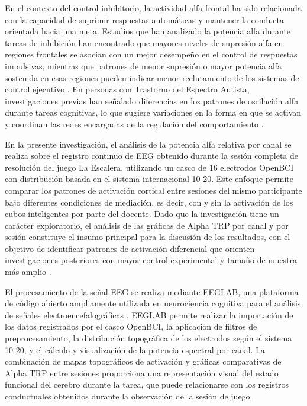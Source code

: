 \documentclass{book}
\begin{document}
En el contexto del control inhibitorio, la actividad alfa 
frontal ha sido relacionada con la capacidad de suprimir 
respuestas automáticas y mantener la conducta orientada 
hacia una meta. Estudios que han analizado la potencia alfa 
durante tareas de inhibición han encontrado que mayores 
niveles de supresión alfa en regiones frontales se asocian 
con un mejor desempeño en el control de respuestas impulsivas, 
mientras que patrones de menor supresión o mayor potencia 
alfa sostenida en esas regiones pueden indicar menor 
reclutamiento de los sistemas de control ejecutivo 
\cite{Klimesch1999, Pfurtscheller1999, Uhlhaas2006}. En 
personas con Trastorno del Espectro Autista, investigaciones 
previas han señalado diferencias en los patrones de 
oscilación alfa durante tareas cognitivas, lo que sugiere 
variaciones en la forma en que se activan y coordinan las 
redes encargadas de la regulación del comportamiento 
\cite{Coben2008, Uhlhaas2006}.

En la presente investigación, el análisis de la potencia 
alfa relativa por canal se realiza sobre el registro 
continuo de EEG obtenido durante la sesión completa de 
resolución del juego La Escalera, utilizando un casco de 
16 electrodos OpenBCI con distribución basada en el sistema 
internacional 10-20. Este enfoque permite comparar los 
patrones de activación cortical entre sesiones del mismo 
participante bajo diferentes condiciones de mediación, 
es decir, con y sin la activación de los cubos inteligentes 
por parte del docente. Dado que la investigación tiene un 
carácter exploratorio, el análisis de las gráficas de 
Alpha TRP por canal y por sesión constituye el insumo 
principal para la discusión de los resultados, con el 
objetivo de identificar patrones de activación diferencial 
que orienten investigaciones posteriores con mayor control 
experimental y tamaño de muestra más amplio 
\cite{Luck2014, Klimesch1999}.

El procesamiento de la señal EEG se realiza mediante 
EEGLAB, una plataforma de código abierto ampliamente 
utilizada en neurociencia cognitiva para el análisis de 
señales electroencefalográficas \cite{Delorme2004}. 
EEGLAB permite realizar la importación de los datos 
registrados por el casco OpenBCI, la aplicación de 
filtros de preprocesamiento, la distribución topográfica 
de los electrodos según el sistema 10-20, y el cálculo 
y visualización de la potencia espectral por canal. 
La combinación de mapas topográficos de activación y 
gráficas comparativas de Alpha TRP entre sesiones 
proporciona una representación visual del estado 
funcional del cerebro durante la tarea, que puede 
relacionarse con los registros conductuales obtenidos 
durante la observación de la sesión de juego.
\end{document}
